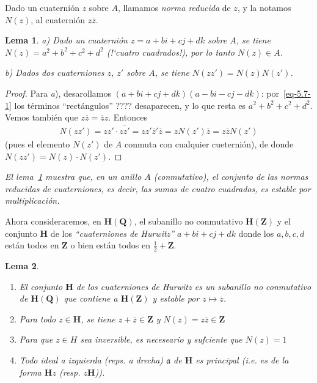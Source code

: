 \documentclass[10pt,oneside,bibtotoc,smallheadings,leqno,a5paper,DIV=12]{scrbook}
\newcommand{\QQ}{\mathbf{Q}}
\newcommand{\ZZ}{\mathbf{Z}}
\newcommand{\HH}{\mathbf{H}}
\newcommand{\idl}[1]{\mathfrak{#1}}
\newcommand{\QED}{}%
\newcommand{\oline}[1]{\overline{#1}}
\numberwithin{equation}{section}
\newenvironment{comm}%
	{\begin{trivlist}\item\small\itshape}
	{\end{trivlist}}
\theoremstyle{defi}
\theoremstyle{enonce}
\newtheorem{lemma}{Lema}
\theoremstyle{rem}
\numberwithin{theorem}{section}
\numberwithin{proposition}{section}
\numberwithin{definition}{section}
\numberwithin{lemma}{section}
\numberwithin{corollary}{section}
\numberwithin{example}{section}
\numberwithin{footnote}{section}%
\begin{document}
Dado un cuaterni\'on $z$ sobre $A$, llamamos {\em norma reducida} de $z$, y la notamos
$N(z)$, al cuaterni\'on $z\oline z$.

\begin{lemma}\label{lem5.7.2}
a) Dado un cuaterni\'on $z = a+bi+cj+dk$ sobre $A$, se tiene
$N(z) = a^{2}+b^{2}+c^{2}+d^{2}$ (!`cuatro cuadrados!), por lo tanto $N(z)\in A$.

b) Dados dos cuaterniones $z$, $z'$ sobre $A$, se tiene $N(zz') = N(z)N(z')$.
\end{lemma}

\begin{proof}
Para {\itshape a}), desarollamos $(a+bi+cj+dk)(a-bi-cj-dk)$: por~\eqref{eq-5.7-1} los t\'erminos
``rect\'angulos'' ???? desaparecen, y lo que resta es $a^{2}+b^{2}+c^{2}+d^{2}$. Vemos tambi\'en que
$z\oline z = \oline z z$. Entonces
\begin{gather*}
N(zz') = zz'\cdot\oline{zz'} = zz'\oline z'\oline z = zN(z')\oline z = z\oline zN(z')
\end{gather*}
(pues el elemento $N(z')$ de $A$ conmuta con cualquier cueterni\'on), de donde $N(zz') = N(z)\cdot N(z')$. \QED
\end{proof}

\begin{comm}
El lema~\ref{lem5.7.2} muestra que, en un anillo $A$ (conmutativo), el conjunto de las normas reducidas de cuaterniones,
es decir, las sumas de cuatro cuadrados, es estable por multiplicaci\'on.
\end{comm}

Ahora consideraremos, en $\HH(\QQ)$, el subanillo no conmutativo $\HH(\ZZ)$ y el conjunto $\HH$ de los
{\em ``cuaterniones de Hurwitz''} $a+bi+cj+dk$ donde los $a, b, c, d$ est\'an todos en $\ZZ$ o
bien est\'an todos en $\frac{1}{2}+\ZZ$.

\begin{lemma}
\begin{enumerate}
\item El conjunto $\HH$ de los cuaterniones de Hurwitz es un subanillo no conmutativo de $\HH(\QQ)$ que
contiene a $\HH(\ZZ)$ y estable por $z\mapsto\oline z$.
\item Para todo $z\in\HH$, se tiene $z+\oline z\in\ZZ$ y $N(z) = z\oline z\in\ZZ$
\item Para que $z\in H$ sea inversible, es neceseario y sufciente que $N(z) = 1$
\item Todo ideal a izquierda (reps. a drecha) $\idl{a}$ de $\HH$ es principal (i.e. es de la forma
$\HH z$ (resp. $z\HH$)).
\end{enumerate}
\end{lemma}
\end{document}
